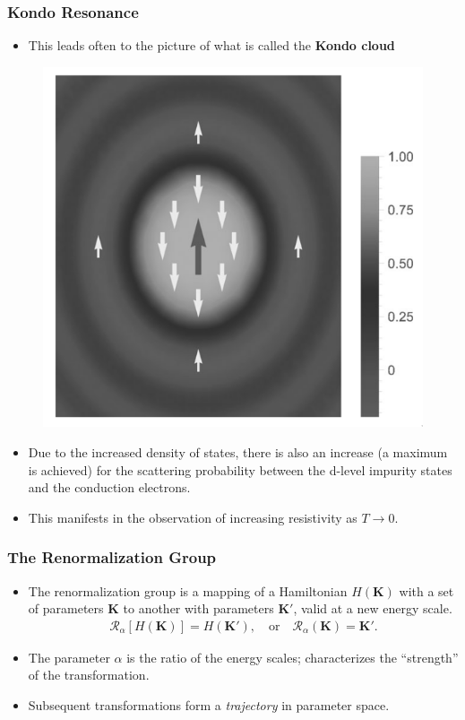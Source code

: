 \documentclass{beamer}
\newcommand{\vv}[1]{\mathbf{\bm{#1}}}
\begin{document}
\begin{frame}
  \frametitle{Kondo Resonance}

  \begin{itemize}
  \item This leads often to the picture of what is called the \textbf{Kondo cloud}
  \end{itemize}

  \begin{figure}
    \centering
    \includegraphics[width=0.3\linewidth]{./gfx/kondo-cloud.png}
  \end{figure}

  \begin{itemize}
  \item Due to the increased density of states, there is also an increase (a maximum is achieved) for the scattering probability between the d-level impurity states and the conduction electrons.
  \item This manifests in the observation of increasing resistivity as $T \rightarrow 0$.
  \end{itemize}
\end{frame}


\begin{frame}
  \frametitle{The Renormalization Group}

  \begin{itemize}
  \item The renormalization group is a mapping of a Hamiltonian $H(\vv{K})$ with a set of parameters $\vv{K}$ to another with parameters $\vv{K}'$, valid at a new energy scale.
    \begin{gather*}
      \mathcal{R}_\alpha [H(\vv{K})] = H(\vv{K}'),\quad\text{or}\quad \mathcal{R}_\alpha(\vv{K}) = \vv{K}'.
    \end{gather*}
  \item The parameter $\alpha$ is the ratio of the energy scales; characterizes the ``strength'' of the transformation.
  \item Subsequent transformations form a \textit{trajectory} in parameter space.
  \end{itemize}
\end{frame}
\end{document}
